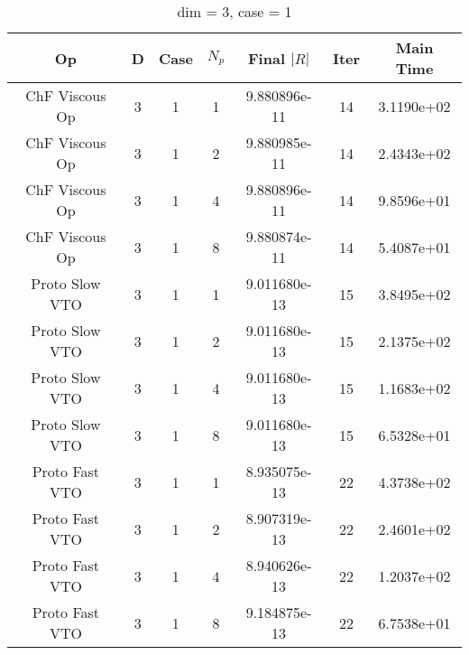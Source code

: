 \documentclass{article}
\begin{document}
\begin{small} 
  \begin{table} [p]
    \begin{center}
      \begin{tabular}{|c|c|c|c|c|c||c|} \hline
        Op & D & Case & $N_p$ & Final $|R|$  &  Iter & Main Time \\
        \hline

        ChF Viscous Op & 3 & 1 & 1& 9.880896e-11 & 14 & 3.1190e+02\\
        ChF Viscous Op & 3 & 1 & 2& 9.880985e-11 & 14 & 2.4343e+02\\
        ChF Viscous Op & 3 & 1 & 4& 9.880896e-11 & 14 & 9.8596e+01\\
        ChF Viscous Op & 3 & 1 & 8& 9.880874e-11 & 14 & 5.4087e+01\\
        Proto Slow VTO & 3 & 1 & 1& 9.011680e-13 & 15 & 3.8495e+02\\
        Proto Slow VTO & 3 & 1 & 2& 9.011680e-13 & 15 & 2.1375e+02\\
        Proto Slow VTO & 3 & 1 & 4& 9.011680e-13 & 15 & 1.1683e+02\\
        Proto Slow VTO & 3 & 1 & 8& 9.011680e-13 & 15 & 6.5328e+01\\
        Proto Fast VTO & 3 & 1 & 1& 8.935075e-13 & 22 & 4.3738e+02\\
        Proto Fast VTO & 3 & 1 & 2& 8.907319e-13 & 22 & 2.4601e+02\\
        Proto Fast VTO & 3 & 1 & 4& 8.940626e-13 & 22 & 1.2037e+02\\
        Proto Fast VTO & 3 & 1 & 8& 9.184875e-13 & 22 & 6.7538e+01\\
        \hline

      \end{tabular} 
    \end{center}   
    \label{__dim_=_3__case_=_1} 
    \caption{dim = 3, case = 1} 
  \end{table} 
\end{small}
\end{document}
